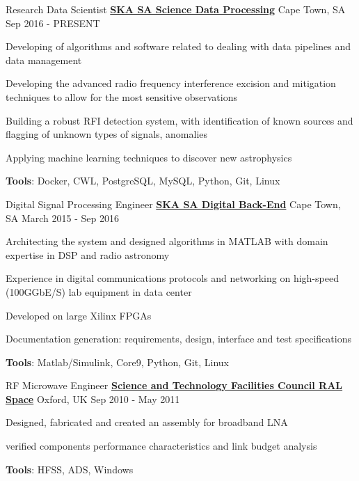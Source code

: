 \begin{cventries}  
  \cventry
  	{Research Data Scientist}
  	{\href{https://www.ska.ac.za/}{\textbf{SKA SA Science Data Processing}}}
  	{Cape Town, SA}
  	{Sep 2016 - PRESENT}
  	{
  		\begin{cvitems}
  				\item {Developing of algorithms and software related to dealing with data pipelines and data management}
  				\item {Developing the advanced radio frequency interference excision and mitigation techniques to allow for the most sensitive observations}   
  				\item {Building a robust RFI detection system, with identification of known sources and flagging of unknown types of signals, anomalies}
  				\item {Applying machine learning techniques to discover new astrophysics}
  				\item {\textbf{Tools}: Docker, CWL, PostgreSQL, MySQL, Python, Git, Linux}
  		\end{cvitems}
  	}
  \cventry
  	{Digital Signal Processing Engineer}
  	{\href{https://www.ska.ac.za/}{\textbf{SKA SA Digital Back-End}}}
  	{Cape Town, SA}
  	{March 2015 - Sep 2016}
  	{
  		\begin{cvitems}
  				\item {Architecting the system and designed algorithms in MATLAB with domain expertise in DSP and radio astronomy}
  				\item {Experience in digital communications protocols and networking on high-speed (100GGbE/S) lab equipment in data center}
  				\item {Developed on large Xilinx FPGAs}
  				\item {Documentation generation: requirements, design, interface and test specifications}
  				\item {\textbf{Tools}: Matlab/Simulink, Core9, Python, Git, Linux}
  		\end{cvitems}
  	}
  \cventry
  	{RF Microwave Engineer}
  	{\href{https://www.ralspace.stfc.ac.uk/}{\textbf{Science and Technology Facilities Council RAL Space}}}
  	{Oxford, UK}
  	{Sep 2010 - May 2011}
  	{
  		\begin{cvitems}
  			\item {Designed, fabricated and created an assembly for broadband LNA} 
  			\item {verified components performance characteristics and link budget analysis}
  			\item {\textbf{Tools}: HFSS, ADS, Windows}

\end{cvitems}}
\end{cventries}
